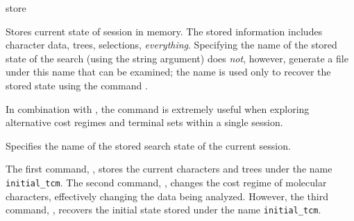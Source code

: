 \begin{command}{store}{}

	\syntax{\obligatory{(\obligatory{\poystring})}} 

	\begin{poydescription}
            Stores current state of \poy session in memory. The stored information
           includes character data, trees, selections, \emph{everything}. Specifying the
           name of the stored state of the search (using the string argument)  does
           \emph{not}, however, generate a file under this name that can be examined;
           the name is used only to recover the stored state using the command .

            In combination with , the command 
            is extremely useful when exploring alternative  cost regimes and terminal sets
            within a single \poy session.
	\end{poydescription}
	
	\begin{arguments}
                {Specifies the name of the stored search state of the current \poy session.}
                {}
	\end{arguments}

    \begin{poyexamples}
            {The first command, , stores the current
            characters and trees under the
            name \texttt{initial\_tcm}. The second command,
            , changes the cost regime of molecular characters,
            effectively changing the data being analyzed. However, the third
            command, , recovers the initial state stored under the
            name \texttt{initial\_tcm}.}
    \end{poyexamples}

    \begin{poyalso}
    \end{poyalso}

\end{command}


